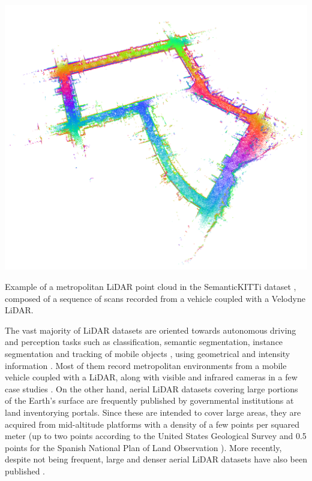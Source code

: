 \begin{marginfigure}[.15cm]
	\includegraphics{figs/context/kitty_scan.png}
	\caption{Example of a metropolitan LiDAR point cloud in the SemanticKITTi dataset \cite{behley_towards_2021}, composed of a sequence of scans recorded from a vehicle coupled with a Velodyne LiDAR.}
	\label{fig:kitty_scan}
\end{marginfigure}
The vast majority of LiDAR datasets are oriented towards autonomous driving and perception tasks such as classification, semantic segmentation, instance segmentation and tracking of mobile objects \cite{chen_automatic_2022}, using geometrical \cite{behley_towards_2021} and intensity information \cite{tan_toronto-3d_2020}. Most of them record metropolitan environments from a mobile vehicle coupled with a LiDAR, along with visible and infrared cameras in a few case studies \cite{choi_kaist_2018}. On the other hand, aerial LiDAR datasets covering large portions of the Earth's surface are frequently published by governmental institutions at land inventorying portals. Since these are intended to cover large areas, they are acquired from mid-altitude platforms with a density of a few points per squared meter (up to two points according to the United States Geological Survey \cite{us_geological_survey_lidar_2012} and 0.5 points for the Spanish National Plan of Land Observation \cite{instituto_geografico_de_informacion_geografica_pnoa_nodate}). More recently, despite not being frequent, large and denser aerial LiDAR datasets have also been published \cite{varney_dales_2020}. 

